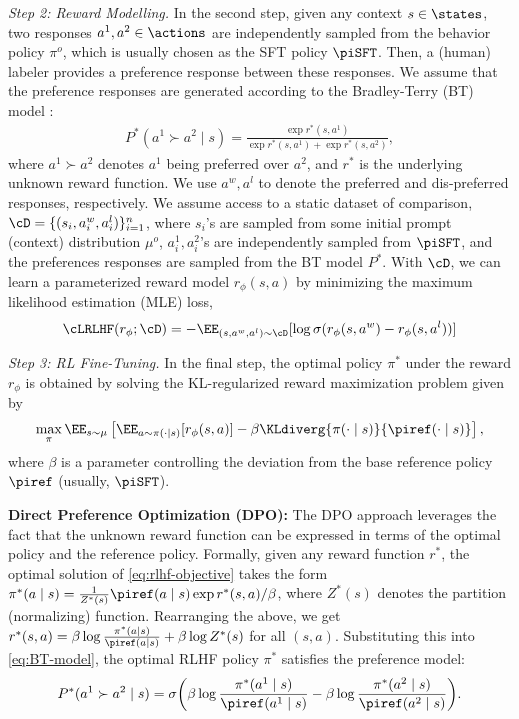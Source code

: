\textit{Step 2: Reward Modelling.} In the second step, given any context $s \in \states$, two responses $a^1,a^2 \in \actions$ are independently sampled from the behavior policy $\pi^o$, which is usually chosen as the SFT policy $\piSFT$. Then, a (human) labeler provides a preference response between these responses. We assume that the preference responses are generated according to the  Bradley-Terry (BT) model \citep{bradley1952rank}: 
\begin{align}\label{eq:BT-model}
        P^*(a^1\succ a^2 \mid s) = \frac{\exp{r^*(s,a^1)}}{\exp{r^*(s,a^1)} + \exp{r^*(s,a^2)}},
    \end{align}
       where  $a^1\succ a^2$ denotes $a^1$ being preferred over $a^2$, and  $r^*$ is the underlying unknown reward function. We use $a^w,a^l$ to denote the preferred and dis-preferred responses, respectively. We assume access to a static dataset of comparison, $\cD=\{(s_i,a^w_i,a^l_i)\}_{i=1}^n$, where $s_i$'s are sampled from some initial prompt (context) distribution $\mu^o$, $a^1_i,a^2_i$'s are independently sampled from $\piSFT$, and the preferences responses are sampled from the BT model $P^*$. With $\cD$, we can learn a parameterized reward model $r_\phi(s,a)$ by  minimizing the  maximum likelihood estimation (MLE) loss,
\begin{equation*}
    \cLRLHF(r_\phi; \cD) = - \EE_{(s,a^w,a^l)\sim\cD} [\log\sigma(r_\phi(s,a^w)-r_\phi(s,a^l))]
\end{equation*}

\textit{Step 3: RL Fine-Tuning.} In the final step, the optimal policy $\pi^*$ under the reward $r_\phi$ is obtained by solving the KL-regularized reward maximization problem given by
\begin{align}\label{eq:rlhf-objective}
    \max_\pi \EE_{s\sim\mu} \left[ \EE_{a\sim\pi(\cdot\mid s)}[r_\phi(s,a)]   -\beta\KLdiverg{\pi(\cdot\mid s)}{\piref(\cdot\mid s)}\right],
\end{align}
where $\beta$ is a parameter controlling the deviation from the base reference policy $\piref$ (usually, $\piSFT$).

\textbf{Direct Preference Optimization (DPO): } The DPO approach \citep{rafailov2023direct} leverages the fact that the unknown reward function can be expressed in terms of the optimal policy and the reference policy. Formally,  given any reward function $r^*$, the optimal solution  of  \cref{eq:rlhf-objective} takes the form $\pi^*(a\mid s) = \frac{1}{Z^*(s)}  \piref(a\mid s)\exp{r^*(s,a)/\beta}$, where $Z^*(s)$ denotes the partition (normalizing) function. Rearranging the above, we get $ r^*(s,a) = \beta \log \frac{\pi^*(a\mid s)}{\piref(a\mid s)} + \beta\log Z^*(s)$ for all $(s,a)$. Substituting this into \cref{eq:BT-model}, the optimal RLHF policy $\pi^*$  satisfies the preference model:{
\begin{align*}
    P^*(a^1\succ a^2\mid s) = \sigma\bigg(\beta\log\frac{\pi^*(a^1\mid s)}{\piref(a^1\mid s)} - \beta\log\frac{\pi^*(a^2\mid s)}{\piref(a^2\mid s)}\bigg).
\end{align*}
}

